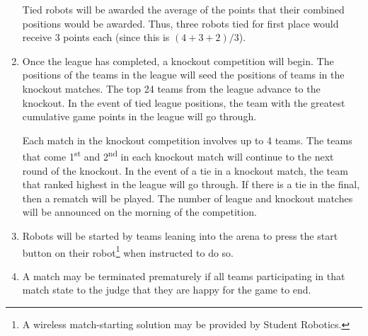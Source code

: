 \begin{enumerate}
      Tied robots will be awarded the average of the points that their combined positions would be awarded.
      Thus, three robots tied for first place would receive 3 points each (since this is $(4+3+2)/3$).

\item Once the league has completed, a knockout competition will begin.
      The positions of the teams in the league will seed the positions of teams in the knockout matches.
      The top 24 teams from the league advance to the knockout.
      In the event of tied league positions, the team with the greatest cumulative game points in the league will go through.

      Each match in the knockout competition involves up to 4 teams.
      The teams that come 1\textsuperscript{st} and 2\textsuperscript{nd} in each knockout match will continue to the next round of the knockout.
      In the event of a tie in a knockout match, the team that ranked highest in the league will go through.
      If there is a tie in the final, then a rematch will be played.
      The number of league and knockout matches will be announced on the morning of the competition.

\item Robots will be started by teams leaning into the arena to press the start button on their robot\footnote{A wireless match-starting solution may be provided by Student Robotics.} when instructed to do so.

\item A match may be terminated prematurely if all teams participating in that match state to the judge that they are happy for the game to end.

\end{enumerate}
